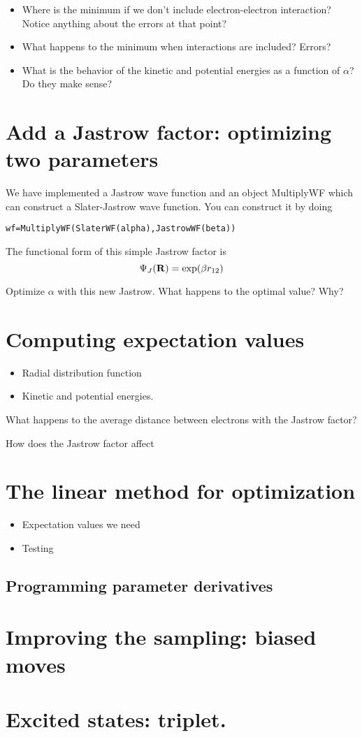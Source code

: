 \documentclass[12pt]{article}
\newcommand{\bR}{{\bf R}}
\begin{document}
\begin{itemize}
\item Where is the minimum if we don't include electron-electron interaction? Notice anything about the errors at that point?
\item What happens to the minimum when interactions are included? Errors?
\item What is the behavior of the kinetic and potential energies as a function of $\alpha$? Do they make sense?	
\end{itemize}


\section{Add a Jastrow factor: optimizing two parameters} 

We have implemented a Jastrow wave function and an object MultiplyWF which can construct a Slater-Jastrow wave function.
You can construct it by doing
\begin{verbatim}
wf=MultiplyWF(SlaterWF(alpha),JastrowWF(beta))	
\end{verbatim}
The functional form of this simple Jastrow factor is 
\begin{equation}
\Psi_J(\bR) = \exp(\beta r_{12})	
\end{equation}

Optimize $\alpha$ with this new Jastrow. What happens to the optimal value? Why? 

\section{Computing expectation values}

\begin{itemize}
\item Radial distribution function	
\item Kinetic and potential energies. 
\end{itemize}

What happens to the average distance between electrons with the Jastrow factor? 

How does the Jastrow factor affect 

\section{The linear method for optimization} 

\begin{itemize}
\item Expectation values we need
\item Testing 
\end{itemize}

\subsection{Programming parameter derivatives}


\section{Improving the sampling: biased moves} 

\section{Excited states: triplet. } 
\end{document}
